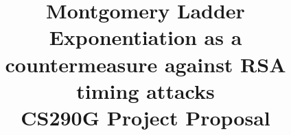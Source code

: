 \documentclass{article}
\begin{document}
\title{Montgomery Ladder Exponentiation as a countermeasure against RSA timing attacks \\
\large{CS290G Project Proposal}}

\autho
\end{document}

